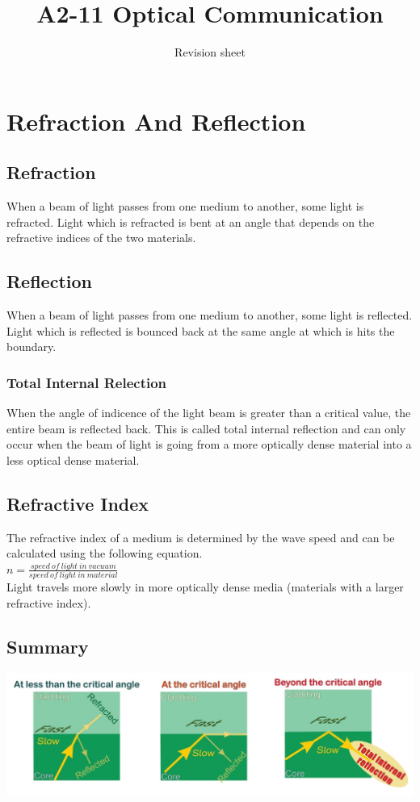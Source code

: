 \documentclass[a4paper,11pt, twocolumn]{article}
\title{A2-11 Optical Communication}
\author{Revision sheet}
\date{}
\begin{document}
\maketitle
\thispagestyle{fancy}

\section{Refraction And Reflection}
\subsection{Refraction}
When a beam of light passes from one medium to another, some light is refracted. Light which is refracted is bent at an angle that depends on the refractive indices of the two materials. 
\subsection{Reflection}
When a beam of light passes from one medium to another, some light is reflected. Light which is reflected is bounced back at the same angle at which is hits the boundary. 
\subsubsection{Total Internal Relection}
When the angle of indicence of the light beam is greater than a critical value, the entire beam is reflected back. This is called total internal reflection and can only occur when the beam of light is going from a more optically dense material into a less optical dense material.
\subsection{Refractive Index}
The refractive index of a medium is determined by the wave speed and can be calculated using the following equation.\\
$\displaystyle n = \frac{speed\ of\ light\ in\ vacuum}{speed\ of\ light\ in\ material}$\\
Light travels more slowly in more optically dense media (materials with a larger refractive index).
\subsection{Summary}
\includegraphics[width=\linewidth]{reflectionRefraction.jpg}
\end{document}
